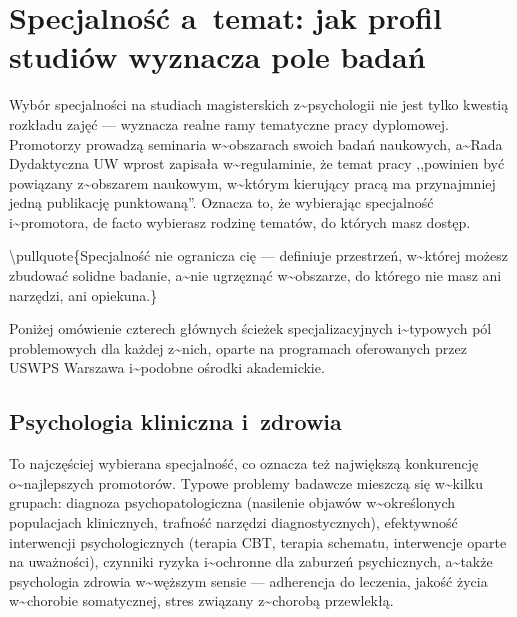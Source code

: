 \documentclass[12pt,a4paper,twoside,openany]{book}
\let\bforigsection\section
\renewcommand{\section}{\needspace{4\baselineskip}\bforigsection}
\begin{document}
\section{Specjalność a~temat: jak profil studiów wyznacza pole badań}


Wybór specjalności na studiach magisterskich z\textasciitilde{}psychologii nie jest tylko kwestią rozkładu zajęć --- wyznacza realne ramy tematyczne pracy dyplomowej. Promotorzy prowadzą seminaria w\textasciitilde{}obszarach swoich badań naukowych, a\textasciitilde{}Rada Dydaktyczna UW wprost zapisała w\textasciitilde{}regulaminie, że temat pracy ,,powinien być powiązany z\textasciitilde{}obszarem naukowym, w\textasciitilde{}którym kierujący pracą ma przynajmniej jedną publikację punktowaną''. Oznacza to, że wybierając specjalność i\textasciitilde{}promotora, de facto wybierasz rodzinę tematów, do których masz dostęp.


\textbackslash{}pullquote\{Specjalność nie ogranicza cię --- definiuje przestrzeń, w\textasciitilde{}której możesz zbudować solidne badanie, a\textasciitilde{}nie ugrzęznąć w\textasciitilde{}obszarze, do którego nie masz ani narzędzi, ani opiekuna.\}


Poniżej omówienie czterech głównych ścieżek specjalizacyjnych i\textasciitilde{}typowych pól problemowych dla każdej z\textasciitilde{}nich, oparte na programach oferowanych przez USWPS Warszawa i\textasciitilde{}podobne ośrodki akademickie.


\subsection{Psychologia kliniczna i~zdrowia}


To najczęściej wybierana specjalność, co oznacza też największą konkurencję o\textasciitilde{}najlepszych promotorów. Typowe problemy badawcze mieszczą się w\textasciitilde{}kilku grupach: diagnoza psychopatologiczna (nasilenie objawów w\textasciitilde{}określonych populacjach klinicznych, trafność narzędzi diagnostycznych), efektywność interwencji psychologicznych (terapia CBT, terapia schematu, interwencje oparte na uważności), czynniki ryzyka i\textasciitilde{}ochronne dla zaburzeń psychicznych, a\textasciitilde{}także psychologia zdrowia w\textasciitilde{}węższym sensie --- adherencja do leczenia, jakość życia w\textasciitilde{}chorobie somatycznej, stres związany z\textasciitilde{}chorobą przewlekłą.
\end{document}
